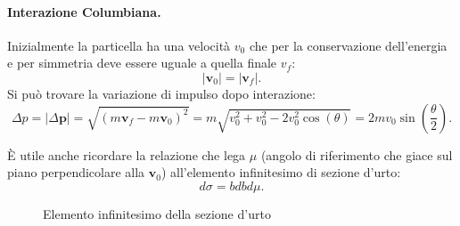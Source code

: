 \paragraph{Interazione Columbiana.}
Inizialmente la particella ha una velocità $v_0$ che per la conservazione dell'energia e per simmetria deve essere uguale a quella finale $v_f$:
 \[
\left| \boldsymbol{v}_0 \right|  = \left| \boldsymbol{v}_f \right| 
.\] 
Si può trovare la variazione di impulso dopo interazione:
\[
	\Delta p = \left| \Delta \boldsymbol{p} \right| = \sqrt{\left( m \boldsymbol{v}_f - m \boldsymbol{v}_0 \right)^2} = m \sqrt{v_0^2 + v_0^2 -2v_0^2 \cos\left( \theta \right)} = 2m v_0 \sin\left( \frac{\theta}{2} \right)   
.\]
 
È utile anche ricordare la relazione che lega $\mu$ (angolo di riferimento che giace sul piano perpendicolare alla $\boldsymbol{v}_0$) all'elemento infinitesimo di sezione d'urto:
\[
d \sigma = b db d\mu
.\] 
\begin{figure}[H]
    \centering
    \caption{Elemento infinitesimo della sezione d'urto}
    \label{fig:elemento-infinitesimo-sez}
\end{figure}

